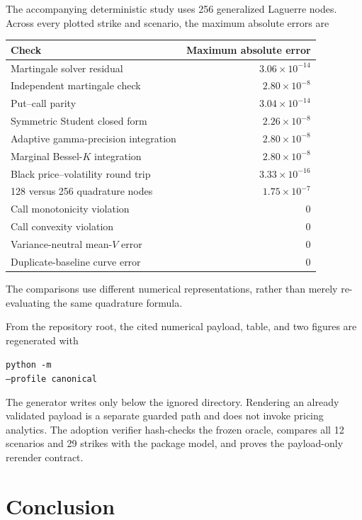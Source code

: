 \documentclass[11pt,a4paper]{article}
\begin{document}
The accompanying deterministic study uses 256 generalized Laguerre nodes.
Across every plotted strike and scenario, the maximum absolute errors are
\begin{center}
\begin{tabular}{@{}lr@{}}
\toprule
Check & Maximum absolute error \\
\midrule
Martingale solver residual & $3.06\times10^{-14}$ \\
Independent martingale check & $2.80\times10^{-8}$ \\
Put--call parity & $3.04\times10^{-14}$ \\
Symmetric Student closed form & $2.26\times10^{-8}$ \\
Adaptive gamma-precision integration & $2.80\times10^{-8}$ \\
Marginal Bessel-$K$ integration & $2.80\times10^{-8}$ \\
Black price--volatility round trip & $3.33\times10^{-16}$ \\
128 versus 256 quadrature nodes & $1.75\times10^{-7}$ \\
Call monotonicity violation & $0$ \\
Call convexity violation & $0$ \\
Variance-neutral mean-$V$ error & $0$ \\
Duplicate-baseline curve error & $0$ \\
\bottomrule
\end{tabular}
\end{center}
The comparisons use different numerical representations, rather than merely
re-evaluating the same quadrature formula.

From the repository root, the cited numerical payload, table, and two figures
are regenerated with
\begin{flushleft}\footnotesize
\texttt{python -m }
\\
\hspace*{1em}\texttt{--profile canonical}
\end{flushleft}
The generator writes only below the ignored
 directory.
Rendering an already validated payload is a separate guarded path and does not
invoke pricing analytics.  The adoption verifier hash-checks the frozen oracle,
compares all 12 scenarios and 29 strikes with the package model, and proves the
payload-only rerender contract.

\section{Conclusion}
\end{document}
